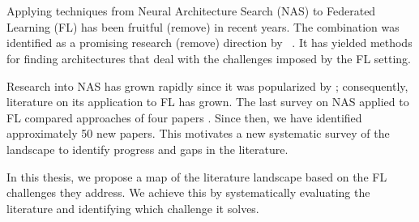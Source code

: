 \chapter{\abstractname}

Applying techniques from Neural Architecture Search (NAS) to Federated Learning (FL) has been fruitful (remove) in recent years. The combination was identified as a promising research (remove) direction by ~\cite{fl_advances_and_open_problems_2021}. It has yielded methods for finding architectures that deal with the challenges imposed by the FL setting.






Research into NAS has grown rapidly \cite{nas_1000_papers_2023} since it was popularized by \cite{nas_with_rl_2017}; consequently, literature on its application to FL has grown. The last survey on NAS applied to FL compared approaches of four papers \cite{fl_to_nas_survey_2021}. Since then, we have identified approximately 50 new papers. This motivates a new systematic survey of the landscape to identify progress and gaps in the literature. 

In this thesis, we propose a map of the literature landscape based on the FL challenges they address. We achieve this by systematically evaluating the literature and identifying which challenge it solves. 

